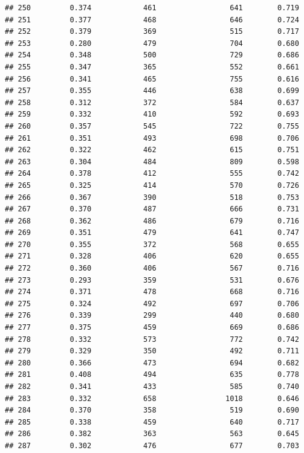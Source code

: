\documentclass[]{book}
\begin{document}
\begin{verbatim}
## 250         0.374            461                 641        0.719
## 251         0.377            468                 646        0.724
## 252         0.379            369                 515        0.717
## 253         0.280            479                 704        0.680
## 254         0.348            500                 729        0.686
## 255         0.347            365                 552        0.661
## 256         0.341            465                 755        0.616
## 257         0.355            446                 638        0.699
## 258         0.312            372                 584        0.637
## 259         0.332            410                 592        0.693
## 260         0.357            545                 722        0.755
## 261         0.351            493                 698        0.706
## 262         0.322            462                 615        0.751
## 263         0.304            484                 809        0.598
## 264         0.378            412                 555        0.742
## 265         0.325            414                 570        0.726
## 266         0.367            390                 518        0.753
## 267         0.370            487                 666        0.731
## 268         0.362            486                 679        0.716
## 269         0.351            479                 641        0.747
## 270         0.355            372                 568        0.655
## 271         0.328            406                 620        0.655
## 272         0.360            406                 567        0.716
## 273         0.293            359                 531        0.676
## 274         0.371            478                 668        0.716
## 275         0.324            492                 697        0.706
## 276         0.339            299                 440        0.680
## 277         0.375            459                 669        0.686
## 278         0.332            573                 772        0.742
## 279         0.329            350                 492        0.711
## 280         0.366            473                 694        0.682
## 281         0.408            494                 635        0.778
## 282         0.341            433                 585        0.740
## 283         0.332            658                1018        0.646
## 284         0.370            358                 519        0.690
## 285         0.338            459                 640        0.717
## 286         0.382            363                 563        0.645
## 287         0.302            476                 677        0.703

\end{verbatim}
\end{document}
